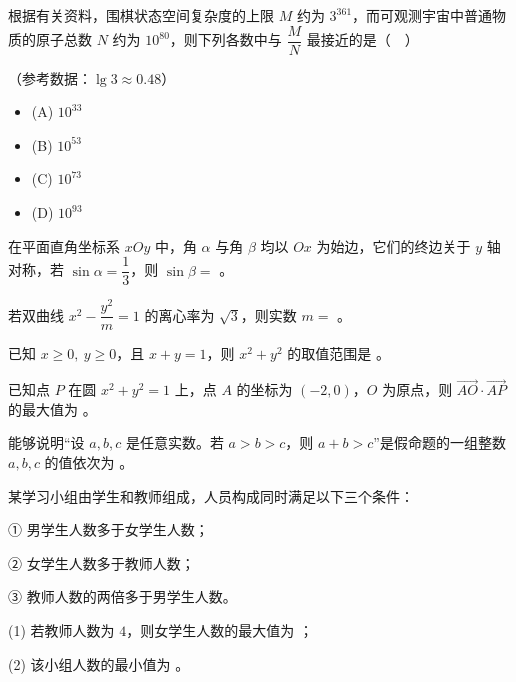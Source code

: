 \begin{question}
根据有关资料，围棋状态空间复杂度的上限 $M$ 约为 $3^{361}$，而可观测宇宙中普通物质的原子总数 $N$ 约为 $10^{80}$，则下列各数中与 $\dfrac MN$ 最接近的是（　）

（参考数据：$\lg3\approx0.48$）

\begin{itemize}
\item (A) $10^{33}$
\item (B) $10^{53}$
\item (C) $10^{73}$
\item (D) $10^{93}$
\end{itemize}

\end{question}

\begin{question}
在平面直角坐标系 $xOy$ 中，角 $\alpha$ 与角 $\beta$ 均以 $Ox$ 为始边，它们的终边关于 $y$ 轴对称，若 $\sin\alpha=\dfrac13$，则 $\sin\beta=$ \gkblank{}。

\end{question}
\begin{question}
若双曲线 $x^2-\dfrac{y^2}{m}=1$ 的离心率为 $\sqrt3$，则实数 $m=$ \gkblank{}。

\end{question}
\begin{question}
已知 $x\geqslant0,\ y\geqslant0$，且 $x+y=1$，则 $x^2+y^2$ 的取值范围是 \gkblank{}。

\end{question}
\begin{question}
已知点 $P$ 在圆 $x^2+y^2=1$ 上，点 $A$ 的坐标为 $(-2,0)$，$O$ 为原点，则 $\overrightarrow{AO}\cdot\overrightarrow{AP}$ 的最大值为 \gkblank{}。

\end{question}
\begin{question}
能够说明“设 $a,b,c$ 是任意实数。若 $a>b>c$，则 $a+b>c$”是假命题的一组整数 $a,b,c$ 的值依次为 \gkblank{}。

\end{question}
\begin{question}
某学习小组由学生和教师组成，人员构成同时满足以下三个条件：

① 男学生人数多于女学生人数；

② 女学生人数多于教师人数；

③ 教师人数的两倍多于男学生人数。

(1)   若教师人数为 $4$，则女学生人数的最大值为 \gkblank{}；

(2)   该小组人数的最小值为 \gkblank{}。

\end{question}

